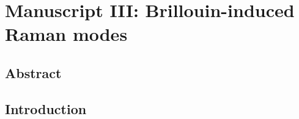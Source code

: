 \setcounter{rownumber}{0}
\singlespacing
\chapter{Manuscript III: Brillouin-induced Raman modes}
\label{ch:Raman}
\acresetall


%

%

\doublespacing


\section{Abstract}
\lipsum[2]


\section{Introduction}
\lipsum[2]

